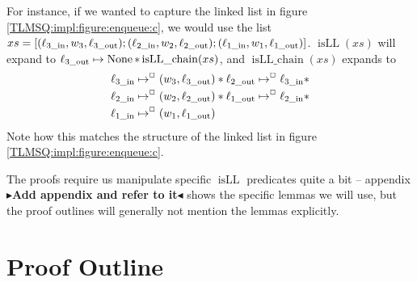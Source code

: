 \documentclass[a4paper, 10pt]{report}
\theoremstyle{definition}
\newcommand{\xsc}{xs}
\newcommand{\isLLchain}{\operatorname{isLL\_chain}}
\newcommand{\isLL}{\operatorname{isLL}}
\newcommand{\locinM}[1]{\loc_{#1\_\mathrm{in}}}
\newcommand{\locoutM}[1]{\loc_{#1\_\mathrm{out}}}
\newcommand{\nodeval}{\valB}
\newcommand{\nodevalM}[1]{\nodeval_{#1}}
\newcommand{\todo}[1]{{\color[rgb]{.5,0,0}\textbf{$\blacktriangleright$#1$\blacktriangleleft$}}}
\begin{document}
For instance, if we wanted to capture the linked list in figure \ref{TLMSQ:impl:figure:enqueue:c}, we would use the list $\xsc = [(\locinM{3}, \nodevalM{3}, \locoutM{3}); (\locinM{2}, \nodevalM{2}, \locoutM{2});  (\locinM{1}, \nodevalM{1}, \locoutM{1})]$. $\isLL(\xsc)$ will expand to $\locoutM{3} \mapsto \None \star \isLLchain(\xsc)$, and $\isLLchain(\xsc)$ expands to
\begin{align*}
  &\locinM{3} \mapsto^{\persistently} (\nodevalM{3}, \locoutM{3}) \star \locoutM{2}	\mapsto^{\persistently} \locinM{3}\star\\
  &\locinM{2} \mapsto^{\persistently} (\nodevalM{2}, \locoutM{2}) \star \locoutM{1}\mapsto^{\persistently} \locinM{2} \star\\
  &\locinM{1} \mapsto^{\persistently} (\nodevalM{1}, \locoutM{1})
\end{align*}
Note how this matches the structure of the linked list in figure \ref{TLMSQ:impl:figure:enqueue:c}.

The proofs require us manipulate specific $\isLL$ predicates quite a bit -- appendix \todo{Add appendix and refer to it} shows the specific lemmas we will use, but the proof outlines will generally not mention the lemmas explicitly.

\section{Proof Outline}
\label{TLMSQSEQ:section:proof-outline}
\end{document}
